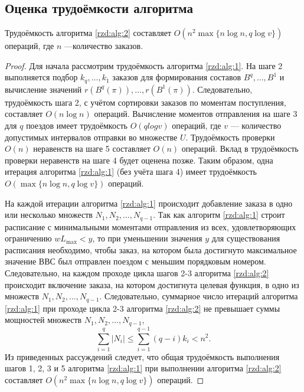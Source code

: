 \subsection{Оценка трудоёмкости алгоритма}\label{rzd:sec:comp:8}
\begin{theorem}\label{rzd:th:3}
Трудоёмкость алгоритма \ref{rzd:alg:2} составляет $O(n^2 \max\{n \log n, q \log v\})$ операций, где $n$ ---количество заказов.
\end{theorem}
\begin{proof}
Для начала рассмотрим трудоёмкость алгоритма \ref{rzd:alg:1}. На шаге 2 выполняется подбор $k_q, \dots, k_1$ заказов для формирования составов $B^q, \dots, B^1$ и вычисление значений $r(B^q(\pi)), \dots, r(B^1(\pi))$. Следовательно, трудоёмкость шага 2, с учётом сортировки заказов по моментам поступления, составляет $O(n \log n)$ операций. Вычисление моментов отправления на шаге 3 для $q$ поездов имеет трудоёмкость $O(q log v)$ операций, где $v$ --- количество допустимых интервалов отправки во множестве $U$. Трудоёмкость проверки $O(n)$ неравенств на шаге 5 составляет $O(n)$ операций. Вклад в трудоёмкость проверки неравенств на шаге 4 будет оценена позже.
Таким образом, одна итерация алгоритма \ref{rzd:alg:1} (без учёта шага 4) имеет трудоёмкость $O(\max\{n \log n, q \log v\})$ операций.

На каждой итерации алгоритма \ref{rzd:alg:1} происходит добавление заказа в одно или несколько множеств $N_1, N_2, \dots , N_{q-1}$. Так как алгоритм \ref{rzd:alg:1} строит расписание с минимальными моментами отправления из всех, удовлетворяющих ограничению $wL_{\max}<y$, то при уменьшении значения $y$ для существования расписания необходимо, чтобы заказ, на котором была достигнуто максимальное значение ВВС был отправлен поездом с меньшим порядковым номером. Следовательно, на каждом проходе цикла шагов 2-3 алгоритма \ref{rzd:alg:2} происходит включение заказа, на котором достигнута целевая функция, в одно из множеств $N_1, N_2, \dots , N_{q-1}$. Следовательно, суммарное число итераций алгоритма \ref{rzd:alg:1} при проходе цикла 2-3 алгоритма \ref{rzd:alg:2} не превышает суммы мощностей множеств $N_1, N_2, \dots , N_{q-1}$,
$$\sum\limits_{i=1}^{q} |N_i| \leq \sum\limits_{i=1}^{q-1} (q-i)k_i < n^2.$$
Из приведенных рассуждений следует, что общая трудоёмкость выполнения шагов 1, 2, 3 и 5 алгоритма \ref{rzd:alg:1} при выполнении алгоритма \ref{rzd:alg:2} составляет $O(n^2 \max\{n \log n, q \log v\})$ операций.


\end{proof}
